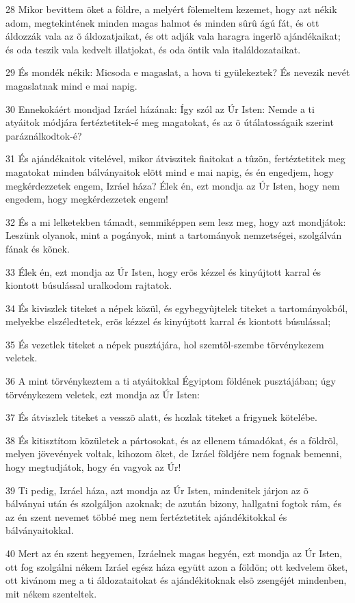 \par 28 Mikor bevittem õket a földre, a melyért fölemeltem kezemet, hogy azt nékik adom, megtekintének minden magas halmot és minden sûrû ágú fát, és ott áldozzák vala az õ áldozatjaikat, és ott adják vala haragra ingerlõ  ajándékaikat; és oda teszik vala kedvelt illatjokat, és oda öntik vala italáldozataikat.
\par 29 És mondék nékik: Micsoda e magaslat, a hova ti gyülekeztek? És nevezik nevét magaslatnak mind e mai napig.
\par 30 Ennekokáért mondjad Izráel házának: Így szól az Úr Isten: Nemde a ti atyáitok módjára fertéztetitek-é meg magatokat, és az õ útálatosságaik szerint paráználkodtok-é?
\par 31 És ajándékaitok vitelével, mikor átviszitek fiaitokat a tûzön, fertéztetitek meg magatokat minden bálványaitok elõtt mind e mai napig, és én engedjem, hogy megkérdezzetek engem, Izráel háza? Élek én, ezt mondja az Úr Isten, hogy nem engedem, hogy megkérdezzetek engem!
\par 32 És a mi lelketekben támadt, semmiképpen sem lesz meg, hogy azt mondjátok: Leszünk olyanok, mint a pogányok, mint a tartományok nemzetségei, szolgálván fának és kõnek.
\par 33 Élek én, ezt mondja az Úr Isten, hogy erõs kézzel és kinyújtott karral és kiontott búsulással uralkodom rajtatok.
\par 34 És kiviszlek titeket a népek közül, és egybegyûjtelek titeket a tartományokból, melyekbe elszéledtetek, erõs kézzel és kinyújtott karral és kiontott búsulással;
\par 35 És vezetlek titeket a népek pusztájára, hol szemtõl-szembe törvénykezem veletek.
\par 36 A mint törvénykeztem a ti atyáitokkal Égyiptom földének pusztájában; úgy törvénykezem veletek, ezt mondja az Úr Isten:
\par 37 És átviszlek titeket a vesszõ alatt, és hozlak titeket a frigynek kötelébe.
\par 38 És kitisztítom közületek a pártosokat, és az ellenem támadókat, és a földrõl, melyen jövevények voltak, kihozom õket, de Izráel földjére nem fognak bemenni, hogy megtudjátok, hogy én vagyok az Úr!
\par 39 Ti pedig, Izráel háza, azt mondja az Úr Isten, mindenitek járjon az õ bálványai után és szolgáljon azoknak; de azután bizony, hallgatni fogtok rám, és az én szent nevemet többé meg nem fertéztetitek ajándékitokkal és bálványaitokkal.
\par 40 Mert az én szent hegyemen, Izráelnek magas hegyén, ezt mondja az Úr Isten, ott fog szolgálni nékem Izráel egész háza együtt azon a földön; ott kedvelem õket, ott kivánom meg a ti áldozataitokat és ajándékitoknak elsõ zsengéjét mindenben, mit nékem szenteltek.
